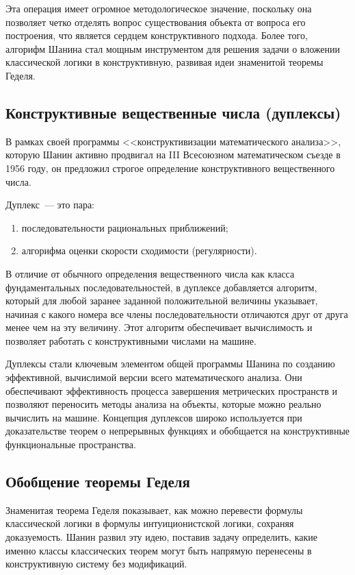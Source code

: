 \documentclass[essay,paper]{pmk-graduate}
\begin{document}
Эта операция имеет огромное методологическое значение, поскольку она позволяет четко отделять вопрос существования объекта от вопроса его построения, что является сердцем конструктивного подхода. Более того, алгорифм Шанина стал мощным инструментом для решения задачи о вложении классической логики в конструктивную, развивая идеи знаменитой теоремы Геделя.

\subsection{Конструктивные вещественные числа (дуплексы)}

В рамках своей программы <<конструктивизации математического анализа>>, которую Шанин активно продвигал на III Всесоюзном математическом съезде в 1956 году, он предложил строгое определение конструктивного вещественного числа.

Дуплекс~--- это  пара:
\begin{enumerate}
    \item последовательности рациональных приближений;
    \item алгорифма оценки скорости сходимости (регулярности).
\end{enumerate}

В отличие от обычного определения вещественного числа как класса фундаментальных последовательностей, в дуплексе добавляется алгоритм, который для любой заранее заданной  положительной величины указывает, начиная с какого номера все члены последовательности отличаются друг от друга менее чем на эту величину. Этот алгоритм обеспечивает вычислимость и позволяет работать с конструктивными числами на машине.

Дуплексы стали ключевым элементом общей программы Шанина по созданию эффективной, вычислимой версии всего математического анализа. Они обеспечивают эффективность процесса завершения метрических пространств и позволяют переносить методы анализа на объекты, которые можно реально вычислить на машине. Концепция дуплексов широко используется при доказательстве теорем о непрерывных функциях и обобщается на конструктивные функциональные пространства.

\subsection{Обобщение теоремы Геделя}

Знаменитая теорема Геделя показывает, как можно перевести формулы классической логики в формулы интуиционистской логики, сохраняя доказуемость. Шанин развил эту идею, поставив задачу определить, какие именно классы классических теорем могут быть напрямую перенесены в конструктивную систему без  модификаций.
\end{document}
